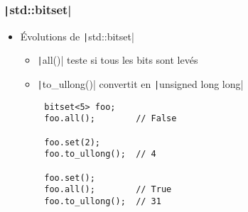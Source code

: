 \documentclass[C++.tex]{subfiles}
\begin{document}
\begin{frame}[fragile]
	\frametitle{\texttt|std::bitset|}
	\begin{itemize}
		\item Évolutions de \texttt|std::bitset|
		\begin{itemize}
			\item \texttt|all()| teste si tous les bits sont levés
			\item \texttt|to_ullong()| convertit en \texttt|unsigned long long|
		\end{itemize}
	\end{itemize}

	\begin{verbatim}
		bitset<5> foo;
		foo.all();        // False

		foo.set(2);
		foo.to_ullong();  // 4

		foo.set();
		foo.all();        // True
		foo.to_ullong();  // 31
	\end{verbatim}

\end{frame}
\end{document}
